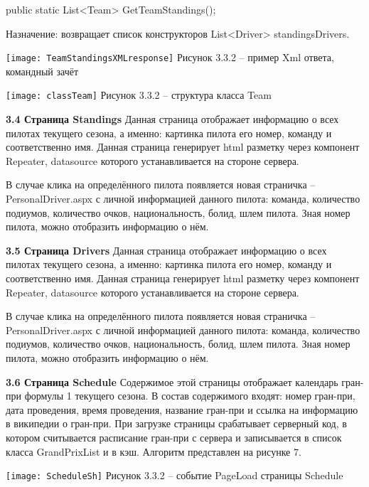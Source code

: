 \documentclass[14pt,a4paper]{extreport}
\begin{document}
 \par
public static List<Team> GetTeamStandings();\par
Назначение: возвращает список конструкторов List<Driver> standingsDrivers.\par	
	\texttt{[image: TeamStandingsXMLresponse]}   
           \center Рисунок 3.3.2 – пример Xml ответа, командный зачёт \par
           \texttt{[image: classTeam]}
           \center Рисунок 3.3.2 – структура класса Team\par
	\textbf{3.4 Страница Standings}
\flushleft\parindent=1cm Данная страница отображает информацию о всех пилотах текущего сезона, а именно: картинка пилота его номер, команду и соответственно имя.
Данная страница генерирует html разметку через компонент Repeater, datasource которого устанавливается на стороне сервера.\par
В случае клика на определённого пилота появляется новая страничка – PersonalDriver.aspx с личной информацией данного пилота: команда, количество подиумов, количество очков, национальность, болид, шлем пилота. Зная номер пилота, можно отобразить информацию о нём.\par
	\textbf{3.5 Страница Drivers}
\flushleft\parindent=1cm Данная страница отображает информацию о всех пилотах текущего сезона, а именно: картинка пилота его номер, команду и соответственно имя.
Данная страница генерирует html разметку через компонент Repeater, datasource которого устанавливается на стороне сервера.\par
В случае клика на определённого пилота появляется новая страничка – PersonalDriver.aspx с личной информацией данного пилота: команда, количество подиумов, количество очков, национальность, болид, шлем пилота. Зная номер пилота, можно отобразить информацию о нём.\par
	\textbf{3.6 Страница Schedule}
\flushleft\parindent=1cm Содержимое этой страницы отображает календарь гран-при формулы 1 текущего сезона. В состав содержимого входят: номер гран-при, дата проведения, время проведения, название гран-при и ссылка на информацию в википедии о гран-при. При загрузке страницы срабатывает серверный код, в котором считывается расписание гран-при с сервера и записывается в список класса GrandPrixList и в кэш. Алгоритм представлен на рисунке 7.\par
	\texttt{[image: ScheduleSh]}   
           \center Рисунок 3.3.2 – событие PageLoad страницы Schedule \par
\end{document}
